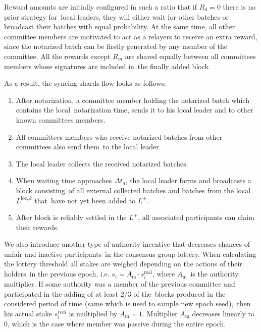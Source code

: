 Reward amounts are initially configured in such a ratio that if ${R_d=0}$ there is no prior strategy for\
local leaders, they will either wait for other batches or broadcast their batches with equal probability.
At the same time, all other committee members are motivated to act as a relayers to receive an extra reward,
since the notarized batch can be firstly generated by any member of the committee.
All the rewards except $R_m$ are shared equally between all committees members whose signatures are included in\
the finally added block.

As a result, the syncing shards flow looks as follows:
\begin{enumerate}
    \item After notarization, a committee member holding the notarized batch which contains the local\
    notarization time, sends it to his local leader and to other known committees members.
    \item All committees members who receive notarized batches from other committees also send them\
    to the local leader.
    \item The local leader collects the received notarized batches.
    \item When waiting time approaches $\Delta t_d$, the local leader forms and broadcasts a block consisting\
    of all external collected batches and batches from the local $L^{\text{loc}, k}$ that\
    have not yet been added to $L^+$.
    \item After block is reliably settled in the $L^+$, all associated participants can claim their rewards.
\end{enumerate}

We also introduce another type of authority incentive that decreases chances of unfair and inactive participants\
in the consensus group lottery.
When calculating the lottery threshold all stakes are weighed depending on the actions of their holders\
in the previous epoch, i.e. ${s_i = A_{\text{m}} \cdot s_i^{\text{real}}}$, where $A_{\text{m}}$\
is the authority multiplier.
If some authority was a member of the previous committee and participated in the adding of at least 2/3 of the\
blocks produced in the considered period of time (same which is used to sample new epoch seed),\
then his actual stake ${s_i^{real}}$ is multiplied by ${A_{\text{m}} = 1}$.
Multiplier $A_{\text{m}}$ decreases linearly to 0, which is the case where member was passive during the entire epoch.

